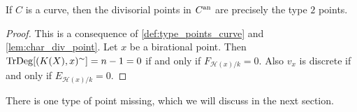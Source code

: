 \begin{remark}
	 If $C$ is a curve, then the divisorial points in $C{}^{\text{an}}$ are precisely the type $2$ points. 
\end{remark}
\begin{proof}
	This is a consequence of \cref{def:type_points_curve} and \cref{lem:char_div_point}.
	Let $x$ be a birational point.
	Then $\operatorname{TrDeg}[(K(X),x)^{\sim} ] = n-1 = 0 $ if and only if $F_{\mathcal{H} (x) / k} = 0$. 
	Also $v_x$ is discrete if and only if $E_{\mathcal{H} (x) / k}= 0$. 
\end{proof}

There is one type of point missing, which we will discuss in the next section. 
